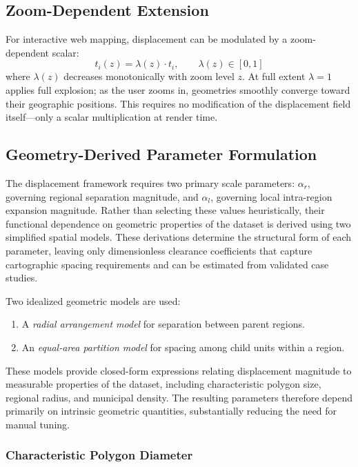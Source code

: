 \documentclass[12pt, a4paper]{article}
\numberwithin{equation}{section}
\begin{document}
\subsection{Zoom-Dependent Extension}

For interactive web mapping, displacement can be modulated by a zoom-dependent scalar:
\begin{equation}
  t_i(z) = \lambda(z) \cdot t_i, \qquad \lambda(z) \in [0, 1]
  \label{eq:zoom}
\end{equation}
where $\lambda(z)$ decreases monotonically with zoom level $z$. At full extent $\lambda = 1$ applies full explosion; as the user zooms in, geometries smoothly converge toward their geographic positions. This requires no modification of the displacement field itself---only a scalar multiplication at render time.

\subsection{Geometry-Derived Parameter Formulation}
\label{sec:autoparams}

The displacement framework requires two primary scale parameters: $\alpha_r$, governing regional separation magnitude, and $\alpha_l$, governing local intra-region expansion magnitude. Rather than selecting these values heuristically, their functional dependence on geometric properties of the dataset is derived using two simplified spatial models. These derivations determine the structural form of each parameter, leaving only dimensionless clearance coefficients that capture cartographic spacing requirements and can be estimated from validated case studies.

Two idealized geometric models are used:
\begin{enumerate}
  \item A \emph{radial arrangement model} for separation between parent regions.
  \item An \emph{equal-area partition model} for spacing among child units within a region.
\end{enumerate}
These models provide closed-form expressions relating displacement magnitude to measurable properties of the dataset, including characteristic polygon size, regional radius, and municipal density. The resulting parameters therefore depend primarily on intrinsic geometric quantities, substantially reducing the need for manual tuning.

\subsubsection{Characteristic Polygon Diameter}
\end{document}
